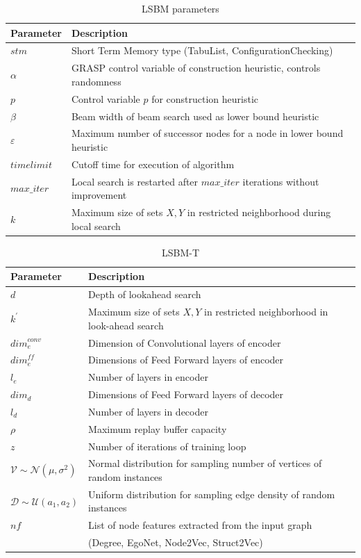 \documentclass[draft,final]{vutinfth} %
\begin{document}
\begin{table}
    \centering
    \begin{tabular}{ll}
        \hline
        Parameter & Description \\ \hline
        $\mathit{stm}$ & Short Term Memory type (TabuList, ConfigurationChecking) \\
        $\alpha$ & GRASP control variable of construction heuristic, controls randomness \\
        $p$ & Control variable $p$ for construction heuristic \\
        $\beta$ & Beam width of beam search used as lower bound heuristic \\
        $\varepsilon$ & Maximum number of successor nodes for a node in lower bound heuristic \\
        $\mathit{timelimit}$ & Cutoff time for execution of algorithm \\
        $\mathit{max\_iter}$ & Local search is restarted after $\mathit{max\_iter}$ iterations without improvement \\
        $k$ & Maximum size of sets $X, Y$ in restricted neighborhood during local search 
    \end{tabular}
    \caption{LSBM parameters}
    \label{tab:parameters-lsbm}
\end{table}

\begin{table}
    \centering
    \begin{tabular}{ll}
        \hline
        Parameter & Description \\ \hline
        $d$ & Depth of lookahead search \\
        $k^\prime$ & Maximum size of sets $X,Y$ in restricted neighborhood in look-ahead search \\
        $\mathit{dim}^{\mathit{conv}}_e$ & Dimension of Convolutional layers of encoder \\
        $\mathit{dim}^{\mathit{ff}}_e$ & Dimensions of Feed Forward layers of encoder \\
        $l_e$ & Number of layers in encoder \\
        $\mathit{dim}_d$ & Dimensions of Feed Forward layers of decoder \\
        $l_d$ & Number of layers in decoder \\
        $\rho$ & Maximum replay buffer capacity \\
        $z$ & Number of iterations of training loop \\
        $\mathcal{V} \sim \mathcal{N}(\mu, \sigma^2)$ & Normal distribution for sampling number of vertices of random instances \\
        $\mathcal{D} \sim \mathcal{U}(a_1, a_2) $ & Uniform distribution for sampling edge density of random instances \\
        $\mathit{nf}$ & List of node features extracted from the input graph  \\
        & (Degree, EgoNet, Node2Vec, Struct2Vec)
    \end{tabular}
    \caption{LSBM-T}
    \label{tab:parameters-lsbm-t}
\end{table}
\end{document}
